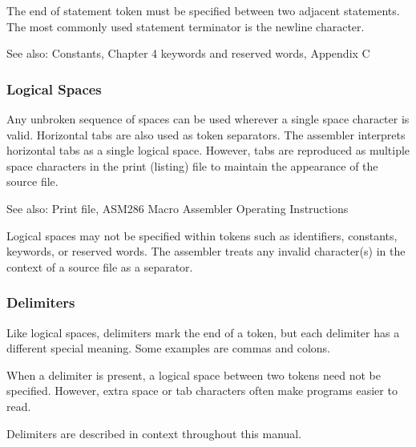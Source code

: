 The end of statement token must be specified between two adjacent statements. The most commonly used statement terminator is the newline character.

See also: Constants, Chapter 4 keywords and reserved words, Appendix C

\subsubsection*{Logical Spaces}
Any unbroken sequence of spaces can be used wherever a single space character is valid. Horizontal tabs are also used as token separators. The assembler interprets horizontal tabs as a single logical space. However, tabs are reproduced as multiple space characters in the print (listing) file to maintain the appearance of the source file.

See also: Print file, ASM286 Macro Assembler Operating Instructions

Logical spaces may not be specified within tokens such as identifiers, constants, keywords, or reserved words. The assembler treats any invalid character(s) in the context of a source file as a separator.

\subsubsection*{Delimiters}
Like logical spaces, delimiters mark the end of a token, but each delimiter has a different special meaning. Some examples are commas and colons.

When a delimiter is present, a logical space between two tokens need not be specified. However, extra space or tab characters often make programs easier to read.

Delimiters are described in context throughout this manual.
